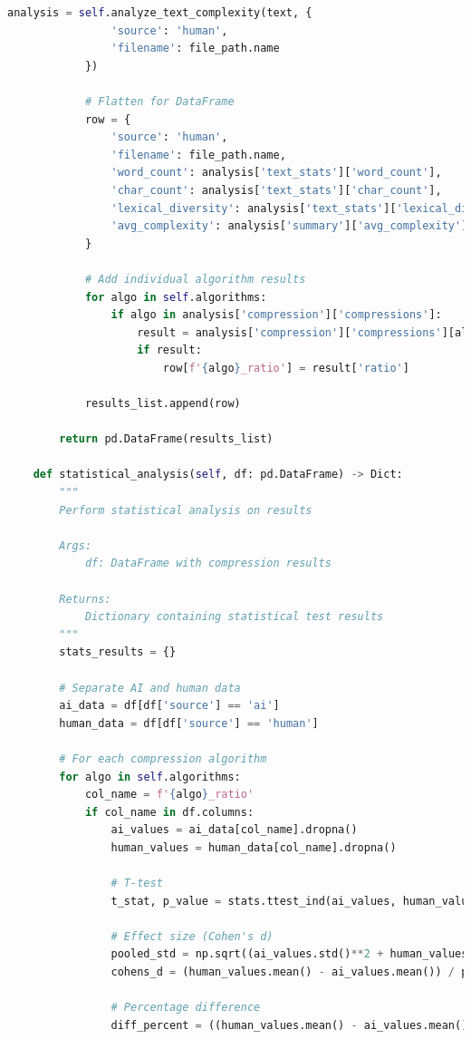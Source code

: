 \documentclass[12pt,a4paper]{report}
\begin{document}
\begin{lstlisting}[language=Python, caption=Complete Compression Analysis Framework]
            analysis = self.analyze_text_complexity(text, {
                'source': 'human',
                'filename': file_path.name
            })

            # Flatten for DataFrame
            row = {
                'source': 'human',
                'filename': file_path.name,
                'word_count': analysis['text_stats']['word_count'],
                'char_count': analysis['text_stats']['char_count'],
                'lexical_diversity': analysis['text_stats']['lexical_diversity'],
                'avg_complexity': analysis['summary']['avg_complexity']
            }

            # Add individual algorithm results
            for algo in self.algorithms:
                if algo in analysis['compression']['compressions']:
                    result = analysis['compression']['compressions'][algo]
                    if result:
                        row[f'{algo}_ratio'] = result['ratio']

            results_list.append(row)

        return pd.DataFrame(results_list)

    def statistical_analysis(self, df: pd.DataFrame) -> Dict:
        """
        Perform statistical analysis on results

        Args:
            df: DataFrame with compression results

        Returns:
            Dictionary containing statistical test results
        """
        stats_results = {}

        # Separate AI and human data
        ai_data = df[df['source'] == 'ai']
        human_data = df[df['source'] == 'human']

        # For each compression algorithm
        for algo in self.algorithms:
            col_name = f'{algo}_ratio'
            if col_name in df.columns:
                ai_values = ai_data[col_name].dropna()
                human_values = human_data[col_name].dropna()

                # T-test
                t_stat, p_value = stats.ttest_ind(ai_values, human_values, equal_var=False)

                # Effect size (Cohen's d)
                pooled_std = np.sqrt((ai_values.std()**2 + human_values.std()**2) / 2)
                cohens_d = (human_values.mean() - ai_values.mean()) / pooled_std

                # Percentage difference
                diff_percent = ((human_values.mean() - ai_values.mean()) / ai_values.mean()) * 100


\end{lstlisting}
\end{document}
